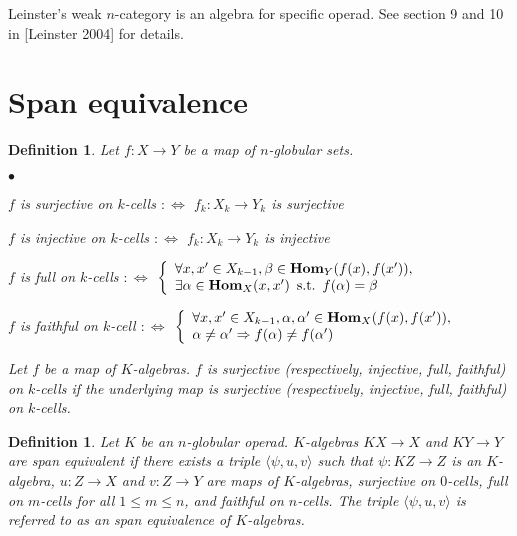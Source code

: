 \documentclass[12pt]{article}
\theoremstyle{plain}
\newtheorem{definition}[theorem]{Definition}
\theoremstyle{definition}
\begin{document}
Leinster's weak $n$-category is an algebra for specific operad. See section 9 and 10 in [Leinster 2004] for details.


\section{Span equivalence}

\begin{definition}
Let $f:X \rightarrow Y$ be a map of $n$-globular sets.
\begin{list}{$\bullet$}{}
\item $f$ is \emph{surjective on $k$-cells} $ : \Leftrightarrow$ $f_k : X_k \rightarrow Y_k $ is surjective
\item $f$ is \emph{injective on $k$-cells} $ : \Leftrightarrow$ $f_k : X_k \rightarrow Y_k $ is injective
\item $f$ is \emph{full on $k$-cells} $ : \Leftrightarrow$ 
$\left\{ \begin{array}{l} 
\forall x, x' \in X_{k-1}, \beta \in {\bf Hom}_{Y}(f(x), f(x')), \\
\exists \alpha \in {\bf Hom}_{X}(x,x') \hspace{5pt} {\rm s.t.} \hspace{5pt} f( \alpha )=\beta \\
\end{array} \right.$
\item $f$ is {\em faithful on $k$-cell} $ : \Leftrightarrow$ 
$\left\{ \begin{array}{l}{}
\forall x,x' \in X_{k-1}, \alpha ,\alpha ' \in {\bf Hom}_{X}(f(x),f(x')), \\
\alpha \neq \alpha ' \Rightarrow f(\alpha) \neq f(\alpha ' )
\end{array} \right.$
\end{list}
Let $f$ be a map of $K$-algebras. $f$ is surjective (respectively, injective, full, faithful) on $k$-cells if the underlying map is surjective (respectively, injective, full, faithful) on $k$-cells.
\end{definition}

\begin{definition}
Let $K$ be an $n$-globular operad. $K$-algebras $KX \rightarrow X$ and $KY \rightarrow Y$ are {\em span equivalent} if there exists a triple $\langle \psi , u, v \rangle$ such that $\psi : KZ \rightarrow Z$ is an $K$-algebra, $u: Z \rightarrow X$ and $v: Z \rightarrow Y$ are maps of $K$-algebras, surjective on $0$-cells, full on $m$-cells for all $1 \leq m \leq n$, and faithful on $n$-cells. The triple $\langle \psi , u, v \rangle$ is referred to as an span equivalence of $K$-algebras.
\end{definition}
\end{document}
